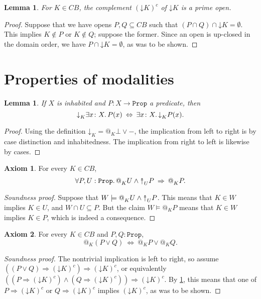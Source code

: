 \documentclass[11pt, oneside, article]{memoir}
\makeatletter
\theoremstyle{plain}
\newtheorem{lemma}[theorem]{Lemma}
\theoremstyle{definition}
\newtheorem{axiom}{Axiom}
\theoremstyle{remark}
\newenvironment{soundproof}{\begin{proof}[Soundness proof]}{\end{proof}}
\newcommand{\const}[1]{\mathtt{#1}}
\newcommand{\Prop}{\const{Prop}}
\newcommand{\BaseSpace}{B}
\newcommand{\AtSymbol}{{@}}
\newcommand{\SeeSymbol}{{\down}}  %
\newcommand{\InSymbol}{{\upclose}}%
\newcommand{\At}[2][]{\AtSymbol^{#1}_{#2}}
\newcommand{\See}[2][]{\SeeSymbol^{#1}_{#2}}
\newcommand{\In}[2][]{\InSymbol^{#1}_{#2}}
\newcommand{\upclose}{{\rotatebox[origin=c]{90}{$\twoheadrightarrow$}}}
\newcommand{\down}{\mathord{\downarrow}}
\newcommand{\imp}{\Rightarrow}
\makeatother
\begin{document}
\begin{lemma}
For $K\in C\BaseSpace$, the complement $(\down K)^c$ of $\down K$ is a prime open.
\label{lem.prime}
\end{lemma}

\begin{proof}
Suppose that we have opens $P,Q\subseteq C\BaseSpace$ such that $(P\cap Q)\cap \down K = \emptyset$. This implies $K\not\in P$ or $K\not\in Q$; suppose the former. Since an open is up-closed in the domain order, we have $P\cap \down K = \emptyset$, as was to be shown.
\end{proof}


\section{Properties of modalities}

\begin{lemma}
If $X$ is inhabited and $P : X \to \Prop$ a predicate, then
\[
	\See{K} \exists x \colon X \ldotp P(x) \: \Leftrightarrow \: \exists x \colon X \ldotp \See{K} P(x).
\]
\label{lem.see_vs_exists}
\end{lemma}

\begin{proof}
Using the definition $\See{K} = \At{K} \bot \vee -$, the implication from left to right is by case distinction and inhabitedness. The implication from right to left is likewise by cases.
\end{proof}

\begin{axiom}\label{ax.atvsin}
For every $K\in C\BaseSpace$,
\[
	\forall P,U : \Prop \ldotp \At{K} U \wedge \In{U} P \: \imp \: \At{K} P.
\]
\end{axiom}

\begin{soundproof}
Suppose that $W \models \At{K} U \wedge \In{U} P$. This means that $K\in W$ implies $K\in U$, and $W \cap U \subseteq P$. But the claim $W \models \At{K}P$ means that $K \in W$ implies $K \in P$, which is indeed a consequence.
\end{soundproof}

\begin{axiom}\label{ax.at_disjunction}
For every $K\in C\BaseSpace$ and $P,Q : \Prop$, 
\[
	\At{K} ( P \vee Q ) \: \Leftrightarrow \: \At{K} P \vee \At{K} Q.
\]
\end{axiom}

\begin{soundproof}
The nontrivial implication is left to right, so assume $((P \vee Q) \imp (\down K)^c ) \imp (\down K)^c$, or equivalently $((P \imp (\down K)^c) \wedge (Q \imp (\down K)^c)) \imp (\down K)^c$. By \cref{lem.prime}, this means that one of $P \imp (\down K)^c$ or $Q \imp (\down K)^c$ implies $(\down K)^c$, as was to be shown.
\end{soundproof}
\end{document}
